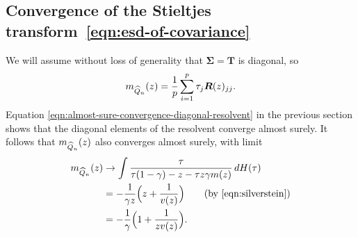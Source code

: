 \documentclass{article}
\newcommand{\bx}{\boldsymbol{x}}
\newcommand{\bSigma}{\boldsymbol{\Sigma}}
\newcommand{\bS}{\boldsymbol{S}}
\newcommand{\bT}{\boldsymbol{T}}
\newcommand{\bR}{\boldsymbol{R}}
\newcommand{\bI}{\boldsymbol{I}}
\begin{document}
\subsection{Convergence of the Stieltjes transform~\eqref{eqn:esd-of-covariance}}
We will assume without loss of generality that $\bSigma = \bT$ is diagonal, so
$$
m_{\wh{Q}_n}(z) = \frac{1}{p} \sum_{i = 1}^{p} \tau_j \bR(z)_{jj}.
$$
Equation \eqref{eqn:almost-sure-convergence-diagonal-resolvent} in the previous section shows that the diagonal elements of the resolvent converge almost surely. It follows that $m_{\widehat{Q}_n}(z)$ also converges almost surely, with limit
\begin{align*}
m_{\wh{Q}_n}(z) 
& \to \int \frac{\tau}{\tau(1 - \gamma) - z - \tau z \gamma m(z)} \,dH(\tau) \\
& = -\frac{1}{\gamma z}\Big(z + \frac{1}{v(z)}\Big) \tag{by~\eqref{eqn:silverstein}}\\
& = -\frac{1}{\gamma}\Big(1 + \frac{1}{zv(z)}\Big).
\end{align*}

\iffalse
The key is to analyze $\bS \bR$. First, we show that $\frac{1}{p}\tr(\bS \bR)$ can be related to the quantity of interest. Notice that $\frac{1}{p}\tr(\bS \bR)$ can be written as the following sum of quadratic forms:
\begin{equation}
	\label{eqn:spectral-measure-Sigma-1}
	\frac{1}{p}\tr(\bS \bR) = \frac{1}{pn} \sum_{k = 1}^{n} \bx_k^{\top} \bR \bx_k.
\end{equation}
We analyze each quadratic form using leave-one-out arguments. Introduce the leave-one-out matrices
$$
\bS_k = \frac{1}{n} \sum_{i \neq k} \bx_i \bx_i^{\top}, \quad \bR_k = (\bS_k - z \bI)^{-1}.
$$
By the resolvent identity, 
$$
\bR_k - \bR = \bR_k(\frac{1}{n} \bx_k \bx_k^{\top}) \bR
$$
and thus
$$
\bx_k^{\top} \bR \bx_k = \frac{\bx_k^{\top} \bR_k \bx_k}{1 + (1/n)\bx_k^{\top} \bR_k \bx_k}.
$$
Arguing as in the preceding section, we have that $\bx_k^{\top} \bR_k \bx_k \approx \tr(\bSigma \bR_k) \approx \tr(\bSigma \bR)$. [The approximations are up to asymptotically negligible terms as $n,p \to \infty$.] Plugged back into~\eqref{eqn:spectral-measure-Sigma-1},
$$
\frac{1}{p}\tr(\bS \bR) \approx \frac{\tr(\bSigma \bR)}{p(1 + (1/n) \tr(\bSigma \bR))} = \frac{(1/p) \tr(\bSigma \bR)}{1 + (\gamma/p) \tr(\bSigma \bR)}.
$$
On the other hand, by the identity $\bS = \bS - z\bI + z \bI$, we have
$$
\bS \bR = \bI  + z \bR \Longrightarrow \sum_{i = 1}^{n} \bx_i \bx_i^{\top} \bR = \bI  + z \bR.
$$ 
Therefore, $(1/p) \tr(\bS \bR) = 1 + z/p\tr(\bR) = 1 + z m_{n}(z)$. We conclude that 
$$
\frac{m_{\hat{Q}_n}(z)}{1 + \gamma m_{\hat{Q}_n}(z)} \approx 1 + z m_{n}(z),
$$ 
where $m_n(z)$ is the Stieltjes transform of $\bS$. In the limit:
$$
\frac{m_{Q}(z)}{1 + \gamma m_{Q}(z)} \approx 1 + z m_{\gamma,H}(z),
$$
which can be rearranged to 
$$
m_{Q}(z) = -\frac{1}{\gamma}\bigg(1 + \frac{1}{z v_{\gamma,H}(z)}\bigg).
$$
\fi
\end{document}
